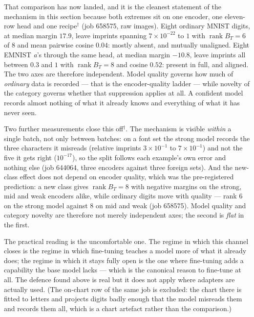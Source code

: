 That comparison has now landed, and it is the cleanest statement of the
mechanism in this section because both extremes sit on one encoder,
one eleven-row head and one recipe$^\dagger$ (job 658575, raw images).
Eight ordinary MNIST digits, at median margin $17.9$, leave imprints spanning
$7\times10^{-22}$ to $1$ with $\operatorname{rank}B_T=6$ of $8$ and mean
pairwise cosine $0.04$: mostly absent, and mutually unaligned. Eight EMNIST
\emph{a}'s through the same head, at median margin $-10.8$, leave imprints all
between $0.3$ and $1$ with $\operatorname{rank}B_T=8$ and cosine $0.52$:
present in full, and aligned. The two axes are therefore independent. Model
quality governs how much of \emph{ordinary} data is recorded --- that is the
encoder-quality ladder --- while novelty of the category governs whether that
suppression applies at all. A confident model records almost nothing of what
it already knows and everything of what it has never seen.

Two further measurements close this off$^\dagger$. The mechanism is visible
\emph{within} a single batch, not only between batches: on a font set the
strong model records the three characters it misreads (relative imprints
$3\times10^{-1}$ to $7\times10^{-1}$) and not the five it gets right
($10^{-17}$), so the split follows each example's own error and nothing else
(job 644064, three encoders against three foreign sets). And the new-class
effect does not depend on encoder quality, which was the pre-registered
prediction: a new class gives $\operatorname{rank}B_T=8$ with negative margins
on the strong, mid and weak encoders alike, while ordinary digits move with
quality --- rank $6$ on the strong model against $8$ on mid and weak (job
658575). Model quality and category novelty are therefore not merely
independent axes; the second is \emph{flat} in the first.

The practical reading is the uncomfortable one. The regime in which this
channel closes is the regime in which fine-tuning teaches a model more of what
it already does; the regime in which it stays fully open is the one where
fine-tuning adds a capability the base model lacks --- which is the canonical
reason to fine-tune at all. The defence found above is real but it does not
apply where adapters are actually used. (The on-chart row of the same job is
excluded: the chart there is fitted to letters and projects digits badly
enough that the model misreads them and records them all, which is a chart
artefact rather than the comparison.)

